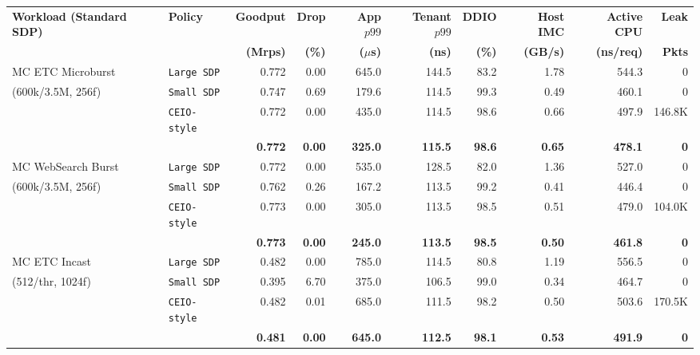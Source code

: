 \begin{table}[t]
\centering
\footnotesize
\setlength{\tabcolsep}{4.0pt}
\renewcommand{\arraystretch}{1.06}
\begin{tabular}{l l r r r r r r r r}
\toprule
\textbf{Workload (Standard SDP)} & \textbf{Policy} &
\textbf{Goodput} & \textbf{Drop} & \textbf{App $p99$} & \textbf{Tenant $p99$} &
\textbf{DDIO} & \textbf{Host IMC} & \textbf{Active CPU} & \textbf{Leak} \\
& & \textbf{(Mrps)} & \textbf{(\%)} & \textbf{($\mu$s)} & \textbf{(ns)} &
\textbf{(\%)} & \textbf{(GB/s)} & \textbf{(ns/req)} & \textbf{Pkts} \\
\midrule
MC ETC Microburst & \texttt{Large SDP}      & 0.772 & 0.00 & 645.0 & 144.5 & 83.2 & 1.78 & 544.3 & 0 \\
(600k/3.5M, 256f) & \texttt{Small SDP}      & 0.747 & 0.69 & 179.6 & 114.5 & 99.3 & 0.49 & 460.1 & 0 \\
                  & \texttt{CEIO-style}     & 0.772 & 0.00 & 435.0 & 114.5 & 98.6 & 0.66 & 497.9 & 146.8K \\
                  & \textbf{\sys{}}         & \textbf{0.772} & \textbf{0.00} & \textbf{325.0} & \textbf{115.5} & \textbf{98.6} & \textbf{0.65} & \textbf{478.1} & \textbf{0} \\
\midrule
MC WebSearch Burst & \texttt{Large SDP}     & 0.772 & 0.00 & 535.0 & 128.5 & 82.0 & 1.36 & 527.0 & 0 \\
(600k/3.5M, 256f)  & \texttt{Small SDP}     & 0.762 & 0.26 & 167.2 & 113.5 & 99.2 & 0.41 & 446.4 & 0 \\
                   & \texttt{CEIO-style}    & 0.773 & 0.00 & 305.0 & 113.5 & 98.5 & 0.51 & 479.0 & 104.0K \\
                   & \textbf{\sys{}}        & \textbf{0.773} & \textbf{0.00} & \textbf{245.0} & \textbf{113.5} & \textbf{98.5} & \textbf{0.50} & \textbf{461.8} & \textbf{0} \\
\midrule
MC ETC Incast      & \texttt{Large SDP}     & 0.482 & 0.00 & 785.0 & 114.5 & 80.8 & 1.19 & 556.5 & 0 \\
(512/thr, 1024f)   & \texttt{Small SDP}     & 0.395 & 6.70 & 375.0 & 106.5 & 99.0 & 0.34 & 464.7 & 0 \\
                   & \texttt{CEIO-style}    & 0.482 & 0.01 & 685.0 & 111.5 & 98.2 & 0.50 & 503.6 & 170.5K \\
                   & \textbf{\sys{}}        & \textbf{0.481} & \textbf{0.00} & \textbf{645.0} & \textbf{112.5} & \textbf{98.1} & \textbf{0.53} & \textbf{491.9} & \textbf{0} \\

\end{tabular}
\end{table}
